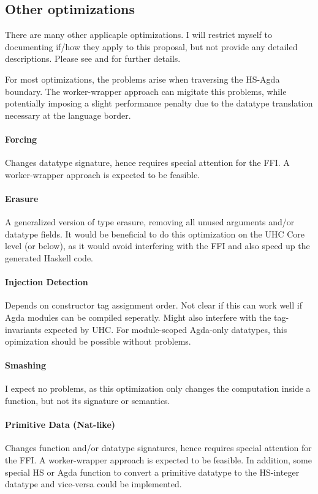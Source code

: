 \documentclass[12pt, a4paper, twoside]{report}
\begin{document}
\subsection{Other optimizations}
There are many other applicaple optimizations. I will restrict myself to documenting if/how they apply to this proposal,
but not provide any detailed descriptions. Please see \cite{fredriksson2011totaly} and \cite{Brady-store-indices2004}
for further details.

For most optimizations, the problems arise when traversing the HS-Agda boundary. The worker-wrapper
approach can migitate this problems, while potentially imposing a slight performance penalty due to the
datatype translation necessary at the language border.
\paragraph{Forcing}
Changes datatype signature, hence requires special attention for the FFI.
A worker-wrapper approach is expected to be feasible.

\paragraph{Erasure}
A generalized version of type erasure, removing all unused arguments and/or datatype fields.
It would be beneficial to do this optimization on the UHC Core level (or below), as it would
avoid interfering with the FFI and also speed up the generated Haskell code.

\paragraph{Injection Detection}
Depends on constructor tag assignment order. Not clear if this can work well if Agda modules can be compiled
seperatly. Might also interfere with the tag-invariants expected by UHC.
For module-scoped Agda-only datatypes, this opimization should be possible without
problems.

\paragraph{Smashing}
I expect no problems, as this optimization only changes the computation inside a function, but not
its signature or semantics.

\paragraph{Primitive Data (Nat-like)}
Changes function and/or datatype signatures, hence requires special attention for the FFI.
A worker-wrapper approach is expected to be feasible. In addition, some special
HS or Agda function to convert a primitive datatype to the HS-integer datatype and vice-versa could be
implemented.
\end{document}
